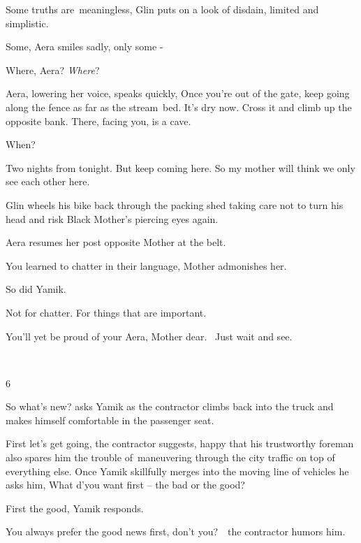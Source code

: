 \documentclass[letterpaper]{article}
\begin{document}
{\textquotedbl}Some truths are~meaningless,{\textquotedbl} Glin puts on a look of disdain, {\textquotedbl}limited and
simplistic.{\textquotedbl}\ 

{\textquotedbl}Some,{\textquotedbl} Aera smiles sadly, {\textquotedbl}only some -{\textquotedbl}~ 

{\textquotedbl}Where, Aera? \textit{Where}?{\textquotedbl}

Aera, lowering her voice, speaks quickly, {\textquotedbl}Once you're out of the gate, keep going along the fence as far
as the stream\ bed. It's dry now. Cross it and climb up the opposite bank. There, facing you, is a
cave.{\textquotedbl}\ 

{\textquotedbl}When?{\textquotedbl}

{\textquotedbl}Two nights from tonight. But keep coming here. So my mother will think we only see each other
here.{\textquotedbl}

Glin wheels his bike back through the packing shed taking care not to turn his head and risk Black Mother's piercing
eyes again.

Aera resumes her post opposite Mother at the belt. 

{\textquotedbl}You learned to chatter in their language,{\textquotedbl} Mother admonishes her.

{\textquotedbl}So did Yamik.{\textquotedbl}

{\textquotedbl}Not for chatter. For things that are important.{\textquotedbl}

{\textquotedbl}You'll yet be proud of your Aera, Mother dear.~ Just wait and see.{\textquotedbl}

~

6 

{\textquotedbl}So what's new?{\textquotedbl} asks Yamik as the contractor climbs back into the truck and makes himself
comfortable in the passenger seat. 

{\textquotedbl}First let's get going,{\textquotedbl} the contractor suggests, happy that his trustworthy foreman also
spares him the trouble of\ maneuvering through the city traffic on top of everything else. Once Yamik skillfully merges
into the moving line of vehicles he asks him, {\textquotedbl}What d'you want first -- the bad or the
good?{\textquotedbl} 

{\textquotedbl}First the good,{\textquotedbl} Yamik responds. 

{\textquotedbl}You always prefer the good news first, don't you?{\textquotedbl}\ \ the contractor humors him. 
\end{document}
